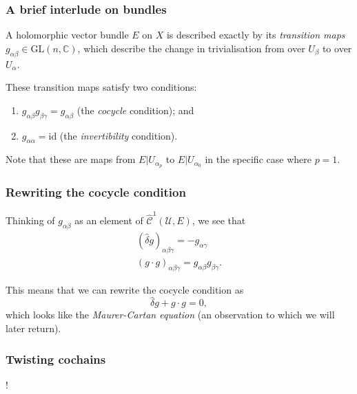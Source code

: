 \documentclass{beamer}
\begin{document}
            \begin{frame}\frametitle{A brief interlude on bundles}
                A holomorphic vector bundle $E$ on $X$ is described exactly by its \emph{transition maps $g_{\alpha\beta}\in\mathrm{GL}(n,\mathbb{C})$}, which describe the change in trivialisation from over $U_\beta$ to over $U_\alpha$.

                \pause

                These transition maps satisfy two conditions:

                \pause
                
                \begin{enumerate}
                    \item $g_{\alpha\beta}g_{\beta\gamma}=g_{\alpha\beta}$ (the \emph{cocycle} condition); and
                    \pause
                    \item $g_{\alpha\alpha}=\mathrm{id}$ (the \emph{invertibility} condition).
                \end{enumerate}

                \pause

                Note that these are maps from $E|U_{\alpha_p}$ to $E|U_{\alpha_0}$ in the specific case where $p=1$.
            \end{frame}

            \begin{frame}\frametitle{Rewriting the cocycle condition}
                Thinking of $g_{\alpha\beta}$ as an element of $\hat{\mathscr{C}}^1(\mathcal{U},E)$, we see that
                \begin{gather*}
                    (\hat{\delta}g)_{\alpha\beta\gamma} = -g_{\alpha\gamma}\\
                    (g\cdot g)_{\alpha\beta\gamma} = g_{\alpha\beta}g_{\beta\gamma}.
                \end{gather*}

                \pause

                This means that we can rewrite the cocycle condition as
                \begin{equation*}
                    \hat{\delta}g + g\cdot g = 0,
                \end{equation*}
                which looks like the \emph{Maurer-Cartan equation} (an observation to which we will later return).
            \end{frame}

            \begin{frame}\frametitle{Twisting cochains}
                \begin{definition}
                    !
                \end{definition}
            \end{frame}
\end{document}
